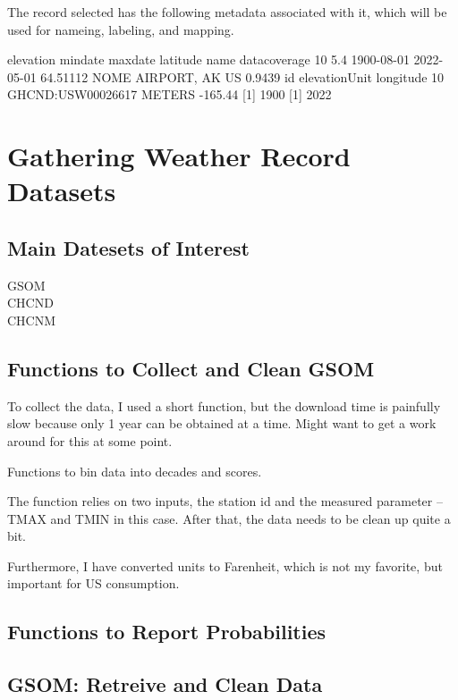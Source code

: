 \documentclass{article}\usepackage[]{graphicx}\usepackage[]{color}
\begin{document}
The record selected has the following metadata associated with it, which will be used for nameing, labeling, and mapping. 

   elevation    mindate    maxdate latitude                name datacoverage
10       5.4 1900-08-01 2022-05-01 64.51112 NOME AIRPORT, AK US       0.9439
                  id elevationUnit longitude
10 GHCND:USW00026617        METERS   -165.44
[1] 1900
[1] 2022


\section{Gathering Weather Record Datasets}

\subsection{Main Datesets of Interest}

\begin{description}
  \item[GSOM]
  \item[CHCND]
  \item[CHCNM]
\end{description}

\subsection{Functions to Collect and Clean GSOM}

To collect the data, I used a short function, but the download time is painfully slow because only 1 year can be obtained at a time. Might want to get a work around for this at some point. 



Functions to bin data into decades and scores. 



The function relies on two inputs, the station id and the measured parameter -- TMAX and TMIN in this case. After that, the data needs to be clean up quite a bit. 

Furthermore, I have converted units to Farenheit, which is not my favorite, but important for US consumption.

\subsection{Functions to Report Probabilities}




\subsection{GSOM: Retreive and Clean Data}
\end{document}
